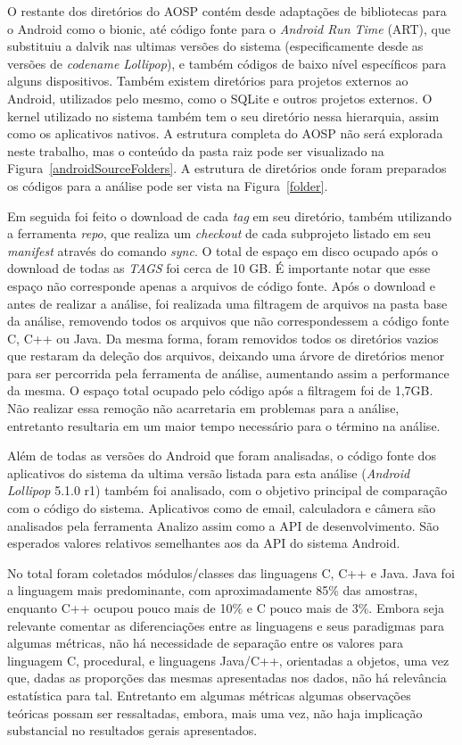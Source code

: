 O restante dos diretórios do AOSP contém desde adaptações de bibliotecas para o Android como o bionic, até código fonte para o \textit{Android Run Time} (ART), que substituiu a dalvik nas ultimas versões do sistema (especificamente desde as versões de \textit{codename Lollipop}), e também códigos de baixo nível específicos para alguns dispositivos. Também existem diretórios para projetos externos ao Android, utilizados pelo mesmo, como o SQLite e outros projetos externos. O kernel utilizado no sistema também tem o seu diretório nessa hierarquia, assim como os aplicativos nativos. A estrutura completa do AOSP não será explorada neste trabalho, mas o conteúdo da pasta raiz pode ser visualizado na Figura~\ref{androidSourceFolders}. A estrutura de diretórios onde foram preparados os códigos para a análise pode ser vista na Figura~\ref{folder}.

Em seguida foi feito o download de cada \textit{tag} em seu diretório, também utilizando a ferramenta \textit{repo}, que realiza um \textit{checkout} de cada subprojeto listado em seu \textit{manifest} através do comando \textit{sync}. O total de espaço em disco ocupado após o download de todas as \textit{TAGS} foi cerca de 10 GB. É importante notar que esse espaço não corresponde apenas a arquivos de código fonte. Após o download e antes de realizar a análise, foi realizada uma filtragem de arquivos na pasta base da análise, removendo todos os arquivos que não correspondessem a código fonte C, C++ ou Java. Da mesma forma, foram removidos todos os diretórios vazios que restaram da deleção dos arquivos, deixando uma árvore de diretórios menor para ser percorrida pela ferramenta de análise, aumentando assim a performance da mesma. O espaço total ocupado pelo código após a filtragem foi de 1,7GB. Não realizar essa remoção não acarretaria em problemas para a análise, entretanto resultaria em um maior tempo necessário para o término na análise.

Além de todas as versões do Android que foram analisadas, o código fonte dos aplicativos do sistema da ultima versão listada para esta análise (\textit{Android Lollipop} 5.1.0 r1) também foi analisado, com o objetivo principal de comparação com o código do sistema. Aplicativos como de email, calculadora e câmera são analisados pela ferramenta Analizo assim como a API de desenvolvimento. São esperados valores relativos semelhantes aos da API do sistema Android.

No total foram coletados módulos/classes das linguagens C, C++ e Java. Java foi a linguagem mais predominante, com aproximadamente 85\% das amostras, enquanto C++ ocupou pouco mais de 10\% e C pouco mais de 3\%. Embora seja relevante comentar as diferenciações entre as linguagens e seus paradigmas para algumas métricas,  não há necessidade de separação entre os valores para linguagem C, procedural, e linguagens Java/C++, orientadas a objetos, uma vez que, dadas as proporções das mesmas apresentadas nos dados, não há relevância estatística para tal. Entretanto em algumas métricas algumas observações teóricas possam ser ressaltadas, embora, mais uma vez, não haja implicação substancial no resultados gerais apresentados.

